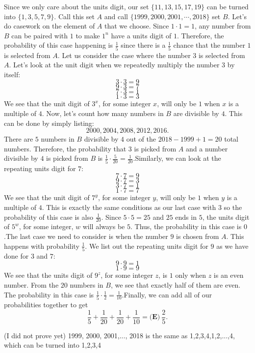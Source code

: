 \begin{enumerate}
Since we only care about the units digit, our set $\{11,13,15,17,19 \}$ can be turned into $\{1,3,5,7,9 \}$. Call this set $A$ and call $\{1999, 2000, 2001, \cdots , 2018 \}$ set $B$. Let's do casework on the element of $A$ that we choose. Since $1\cdot 1=1$, any number from $B$ can be paired with $1$ to make $1^n$ have a units digit of $1$. Therefore, the probability of this case happening is $\frac{1}{5}$ since there is a $\frac{1}{5}$ chance that the number $1$ is selected from $A$. Let us consider the case where the number $3$ is selected from $A$. Let's look at the unit digit when we repeatedly multiply the number $3$ by itself:
 \[3\cdot 3=9\]
 \[9\cdot 3=7\] 
 \[7\cdot 3=1\]
 \[1\cdot 3=3\]We see that the unit digit of $3^x$, for some integer $x$, will only be $1$ when $x$ is a multiple of $4$. Now, let's count how many numbers in $B$ are divisible by $4$. This can be done by simply listing:
 \[2000,2004,2008,2012,2016.\]There are $5$ numbers in $B$ divisible by $4$ out of the $2018-1999+1=20$ total numbers. Therefore, the probability that $3$ is picked from $A$ and a number divisible by $4$ is picked from $B$ is $\frac{1}{5}\cdot \frac{5}{20}=\frac{1}{20}.$Similarly, we can look at the repeating units digit for $7$:
 \[7\cdot 7=9\]
 \[9\cdot 7=3\]
 \[3\cdot 7=1\]
 \[1\cdot 7=7\]We see that the unit digit of $7^y$, for some integer $y$, will only be $1$ when $y$ is a multiple of $4$. This is exactly the same conditions as our last case with $3$ so the probability of this case is also $\frac{1}{20}$. Since $5\cdot 5=25$ and $25$ ends in $5$, the units digit of $5^w$, for some integer, $w$ will always be $5$. Thus, the probability in this case is $0$.The last case we need to consider is when the number $9$ is chosen from $A$. This happens with probability $\frac{1}{5}.$ We list out the repeating units digit for $9$ as we have done for $3$ and $7$:
 \[9\cdot 9=1\]
 \[1\cdot 9=9\]We see that the units digit of $9^z$, for some integer $z$, is $1$ only when $z$ is an even number. From the $20$ numbers in $B$, we see that exactly half of them are even. The probability in this case is $\frac{1}{5}\cdot \frac{1}{2}=\frac{1}{10}.$Finally, we can add all of our probabilities together to get 
 \[\frac{1}{5}+\frac{1}{20}+\frac{1}{20}+\frac{1}{10}=\boxed{\textbf{(E)} ~\frac{2}{5}}.\]

 (I did not prove yet) {1999, 2000, 2001,..., 2018} is the same as {1,2,3,4,1,2,...,4}, which can be turned into {1,2,3,4}

 




\end{enumerate}
